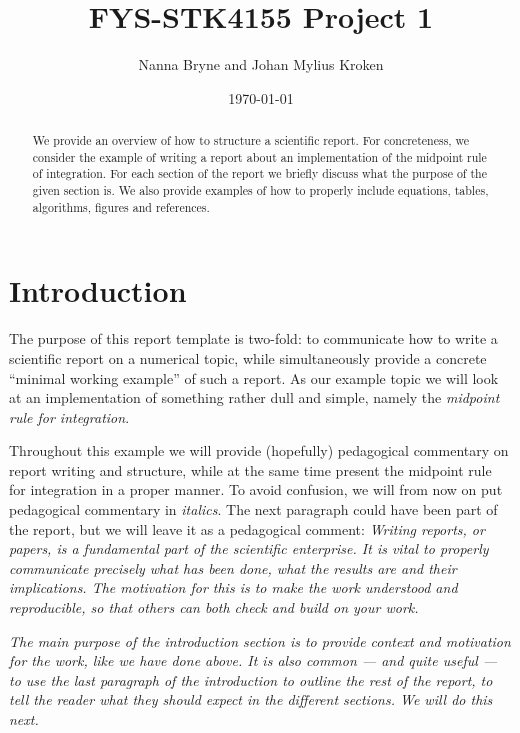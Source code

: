 \documentclass[english,notitlepage,reprint,nofootinbib]{revtex4-1}  %
\begin{document}
\title{FYS-STK4155 Project 1}  %
\author{Nanna Bryne and Johan Mylius Kroken} %
\date{\today}                             %
\noaffiliation                            %

\begin{abstract}
    We provide an overview of how to structure a scientific report. For concreteness, we consider the example of writing a report about an implementation of the midpoint rule of integration. For each section of the report we briefly discuss what the purpose of the given section is. We also provide examples of how to properly include equations, tables, algorithms, figures and references.
\end{abstract}
\maketitle


\section{Introduction}
%
The purpose of this report template is two-fold: to communicate how to write a scientific report on a numerical topic, while simultaneously provide a concrete ``minimal working example'' of such a report. As our example topic we will look at an implementation of something rather dull and simple, namely the \textit{midpoint rule for integration}.

Throughout this example we will provide (hopefully) pedagogical commentary on report writing and structure, while at the same time present the midpoint rule for integration in a proper manner. To avoid confusion, we will from now on put pedagogical commentary in \textit{italics}. The next paragraph could have been part of the report, but we will leave it as a pedagogical comment: \textit{Writing reports, or papers, is a fundamental part of the scientific enterprise. It is vital to properly communicate precisely what has been done, what the results are and their implications. The motivation for this is to make the work understood and reproducible, so that others can both check and build on your work.}

\textit{The main purpose of the introduction section is to provide context and motivation for the work, like we have done above. It is also common --- and quite useful --- to use the last paragraph of the introduction to outline the rest of the report, to tell the reader what they should expect in the different sections. We will do this next.}
\end{document}
